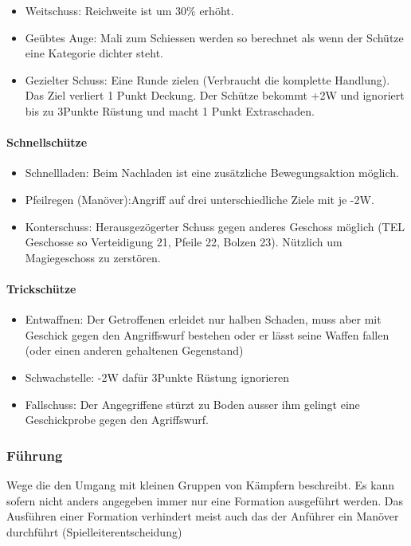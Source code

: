 \documentclass{article}
\begin{document}
\begin{itemize}
\item Weitschuss: Reichweite ist um 30\% erhöht.
\item Geübtes Auge: Mali zum Schiessen werden so berechnet als wenn der Schütze eine Kategorie dichter steht.
\item Gezielter Schuss: Eine Runde zielen (Verbraucht die komplette Handlung). Das Ziel verliert 1 Punkt Deckung. Der Schütze bekommt +2W und ignoriert bis zu 3Punkte Rüstung und macht 1 Punkt Extraschaden.
\end{itemize}

\paragraph{Schnellschütze}

\begin{itemize}
\item Schnellladen: Beim Nachladen ist eine zusätzliche Bewegungsaktion möglich.
\item Pfeilregen (Manöver):Angriff auf drei unterschiedliche Ziele mit je -2W.
\item Konterschuss: Herausgezögerter Schuss gegen anderes Geschoss möglich (TEL Geschosse so Verteidigung 21, Pfeile 22, Bolzen 23). Nützlich um Magiegeschoss zu zerstören.
\end{itemize}

\paragraph{Trickschütze}

\begin{itemize}
\item Entwaffnen: Der Getroffenen erleidet nur halben Schaden, muss aber mit Geschick gegen den Angriffswurf bestehen oder er lässt seine Waffen fallen (oder einen anderen gehaltenen Gegenstand)
\item Schwachstelle: -2W dafür 3Punkte Rüstung ignorieren
\item Fallschuss: Der Angegriffene stürzt zu Boden ausser ihm gelingt eine Geschickprobe gegen den Agriffswurf.
\end{itemize}

\subsubsection{Führung}

Wege die den Umgang mit kleinen Gruppen von Kämpfern beschreibt. Es kann sofern nicht anders angegeben immer nur eine
Formation ausgeführt werden. Das Ausführen einer Formation verhindert meist auch das der Anführer ein Manöver
durchführt (Spielleiterentscheidung)
\end{document}
